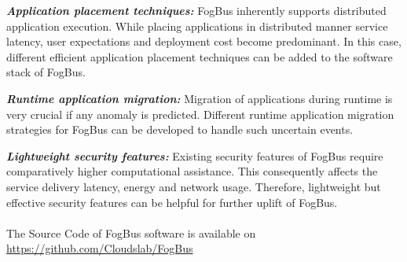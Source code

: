 \documentclass[final,5p,times,twocolumn]{elsarticle}
\begin{document}
\par \textbf{\textit{Application placement techniques:}} FogBus inherently supports distributed application execution. While placing applications in distributed manner service latency, user expectations and deployment cost become predominant. In this case, different efficient application placement techniques can be added to the software stack of FogBus. 
\par \textbf{\textit{Runtime application migration:}} Migration of applications during runtime is very crucial if any anomaly is predicted. Different runtime application migration strategies for FogBus can be developed to handle such uncertain events.         
\par \textbf{\textit{Lightweight security features:}} Existing security features of FogBus require comparatively higher computational assistance. This consequently affects the service delivery latency, energy and network usage. Therefore, lightweight but effective security features can be helpful for further uplift of FogBus.\\ \\
The Source Code of FogBus software is available on \url{https://github.com/Cloudslab/FogBus} 
 



\end{document}
